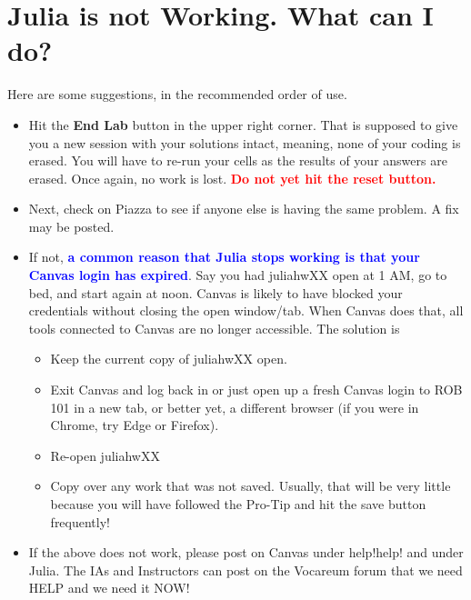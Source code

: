 \setlength{\fboxrule}{3pt}%
	\centerline{ %
}


\section{Julia is not Working. What can I do?}

Here are some suggestions, in the recommended order of use. 
\begin{itemize}

    \item Hit the \textbf{End Lab} button in the upper right corner. That is supposed to give you a new session with your solutions intact, meaning, none of your coding is erased. You will have to re-run your cells as the results of your answers are erased. Once again, no work is lost. \textcolor{red}{\bf Do not yet hit the reset button.}

    \item Next, check on Piazza to see if anyone else is having the same problem. A fix may be posted.

    \item If not, \textcolor{blue}{\bf a common reason that Julia stops working is that your Canvas login has expired}. Say you had juliahwXX open at 1 AM, go to bed, and start again at noon. Canvas is likely to have blocked your credentials without closing the open window/tab. When Canvas does that, all tools connected to Canvas are no longer accessible. The solution is 
    \begin{itemize}
    \item Keep the current copy of juliahwXX open. 
    \item Exit Canvas and log back in or just open up a fresh Canvas login to ROB 101 in a new tab, or better yet, a different browser (if you were in Chrome, try Edge or Firefox).
    \item Re-open juliahwXX
    \item Copy over any work that was not saved. Usually, that will be very little because you will have followed the Pro-Tip and hit the save button frequently! 
    \end{itemize}

    \item If the above does not work, please post on Canvas under help!help! and under Julia. The IAs and Instructors can post on the Vocareum forum that we need HELP and we need it NOW!


\end{itemize}
